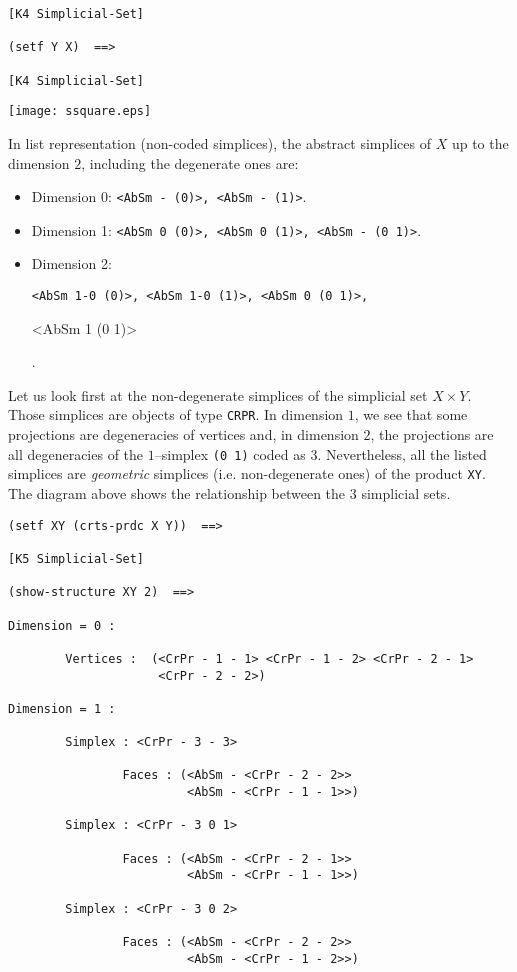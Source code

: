 {{\begin{verbatim}
[K4 Simplicial-Set]

(setf Y X)  ==>

[K4 Simplicial-Set]
\end{verbatim}}
%
\vskip 0.40cm
\centerline{\texttt{[image: ssquare.eps]}}
\vskip 0.40cm
%

In list representation (non-coded simplices), the  abstract simplices of $X$ up to the dimension $2$,
including the degenerate ones are:
\begin{itemize}
\item {Dimension 0}: {\footnotesize {\tt <AbSm - (0)>, <AbSm - (1)>}}.
\item {Dimension 1}: {\footnotesize {\tt <AbSm 0 (0)>,  <AbSm 0 (1)>,  <AbSm - (0 1)>}}.
\item {Dimension 2}: {\footnotesize {\tt <AbSm 1-0 (0)>, <AbSm 1-0 (1)>,  <AbSm 0 (0 1)>, \par
 <AbSm 1 (0 1)>}}.
\end{itemize}

Let us look first at the non-degenerate simplices of the simplicial set $X \times Y$. Those simplices are objects
of type  {\tt CRPR}. In dimension $1$, we see that some projections are
degeneracies of vertices and, in dimension $2$, the projections are all degeneracies of
the $1$--simplex {\tt(0 1)} coded as $3$. Nevertheless, all the listed simplices are {\em geometric}
simplices (i.e. non-degenerate ones) of the product {\tt XY}. The diagram above shows the relationship between
the $3$ simplicial sets.
{\footnotesize\begin{verbatim}
(setf XY (crts-prdc X Y))  ==>

[K5 Simplicial-Set]

(show-structure XY 2)  ==>

Dimension = 0 :

        Vertices :  (<CrPr - 1 - 1> <CrPr - 1 - 2> <CrPr - 2 - 1>
                     <CrPr - 2 - 2>)

Dimension = 1 :

        Simplex : <CrPr - 3 - 3>

                Faces : (<AbSm - <CrPr - 2 - 2>>
                         <AbSm - <CrPr - 1 - 1>>)

        Simplex : <CrPr - 3 0 1>

                Faces : (<AbSm - <CrPr - 2 - 1>>
                         <AbSm - <CrPr - 1 - 1>>)

        Simplex : <CrPr - 3 0 2>

                Faces : (<AbSm - <CrPr - 2 - 2>>
                         <AbSm - <CrPr - 1 - 2>>)


\end{verbatim}}}

